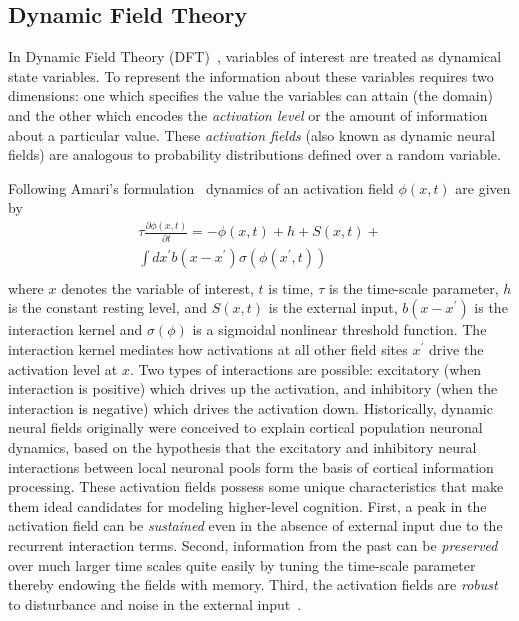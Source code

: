 \documentclass[journal]{IEEEtran}
\begin{document}
\subsection{Dynamic Field Theory}\label{ssec:dft}

In Dynamic Field Theory (DFT)~\cite{schoner2015dynamic}, variables of interest are treated as dynamical state variables. To represent the information about these variables requires two dimensions: one which specifies the value the variables can attain (the domain) and the other which encodes the \textit{activation level} or the amount of information about a particular value. These \textit{activation fields} (also known as dynamic neural fields) are analogous to probability distributions defined over a random variable. 

Following Amari's formulation~\cite{amari1977dynamics} dynamics of an activation field $\phi(x, t)$ are given by 
\begin{multline*}
\tau\frac{\partial{\phi}(x,t)}{\partial t} = -\phi(x,t) + h + S(x,t) + \\ \int\limits_{}^{}dx^{\prime}b(x-x^{\prime})\sigma(\phi(x^{\prime}, t)) 
\end{multline*} 
where $x$ denotes the variable of interest, $t$ is time, $\tau$ is the time-scale parameter, $h$ is the constant resting level, and $S(x,t)$ is the external input, $b(x-x^\prime)$ is the interaction kernel and $\sigma(\phi)$ is a sigmoidal nonlinear threshold function. The interaction kernel mediates how activations at all other field sites $x^\prime$ drive the activation level at $x$. Two types of interactions are possible: excitatory (when interaction is positive) which drives up the activation, and inhibitory (when the interaction is negative) which drives the activation down. 
Historically, dynamic neural fields originally were conceived to explain cortical population neuronal dynamics, based on the hypothesis that the excitatory and inhibitory neural interactions between local neuronal pools form the basis of cortical information processing. 
These activation fields possess some unique characteristics that make them ideal candidates for modeling higher-level cognition. First, a peak in the activation field can be \textit{sustained} even in the absence of external input due to the recurrent interaction terms. Second, information from the past can be \textit{preserved} over much larger time scales quite easily by tuning the time-scale parameter thereby endowing the fields with memory. Third, the activation fields are \textit{robust} to disturbance and noise in the external input~\cite{schoner2008dynamical}.
\end{document}
